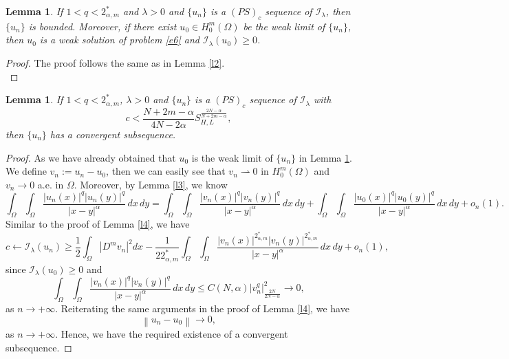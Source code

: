 \documentclass[reqno]{amsart}
\newtheorem{lemma}[theorem]{Lemma}
\newcommand{\DD} {\displaystyle}
\newcommand{\la} {\lambda}
\newcommand{\Om}{\Omega}
\newcommand{\weak}{\rightharpoonup}
\newcommand{\al} {\alpha}
\newcommand{\mc} {\mathcal}
\numberwithin{theorem}{section} \numberwithin{equation}{section}
\begin{document}
\begin{lemma}\label{l7}
If $1<q<2_{\al, m}^*$ and $\la>0$ and $\{u_n\}$ is a $(P S)_c$ sequence of $\mc{I_\la}$, then $\{u_n\}$ is bounded. Moreover, if there exist $u_0\in H_0^m(\Om)$ be the weak limit of $\{u_n\}$, then $u_0$ is a weak solution of problem \eqref{e6} and $\mc{I_\la}(u_0)\geq0$.
\end{lemma}
\begin{proof}
The proof follows the same as in Lemma \ref{l2}.\\

\end{proof}
\begin{lemma}\label{l8}
If $1<q<2_{\al, m}^*$, $\la>0$ and $\{u_n\}$ is a $(P S)_c$ sequence of $\mc{I}_\la$ with
\[c<\frac{N+2m-\al}{4 N-2 \al} S_{H, L}^{\frac{2N-\al}{N+2m-\al}},\]
then $\{u_n\}$ has a convergent subsequence.
\end{lemma}
\begin{proof}
As we have already obtained that $u_0$ is the weak limit of $\{u_n\}$ in Lemma \ref{l7}.\\ We define $v_n:=u_n-u_0$, then we can easily see that $v_n \weak 0$ in $H_0^m(\Om)$ and $v_n \rightarrow 0$ a.e. in $\Om$. Moreover, by Lemma \ref{l3}, we know
\[\DD\int_{\Om} \int_{\Om} \frac{|u_n(x)|^q |u_n(y)|^q}{|x-y|^\al} \, dx \, dy=\int_{\Om} \int_{\Om} \frac{\left|v_n(x)\right|^q\left|v_n(y)\right|^q}{|x-y|^\al} \, dx \, dy+\int_{\Om} \int_{\Om} \frac{|u_0(x)|^q\left|u_0(y)\right|^q}{|x-y|^\al} \, dx \, dy+o_n(1).\]
Similar to the proof of Lemma \ref{l4}, we have
\[
c \leftarrow \mc{I_\la}\left(u_n\right) \geq \frac{1}{2} \int_{\Om}\left|D^mv_n\right|^2 d x-\frac{1}{22_{\al, m}^*} \int_{\Om} \int_{\Om} \frac{\left|v_n(x)\right|^{2_{\al, m}^*}\left|v_n(y)\right|^{2_{\al, m}^*}}{|x-y|^\al} \, dx \, dy+o_n(1),
\]
since $\mc{I_\la}(u_0) \geq 0$ and
\[
\int_{\Om} \int_{\Om} \frac{\left|v_n(x)\right|^q\left|v_n(y)\right|^q}{|x-y|^\al} \, dx \, dy \leq C(N, \al)\left|v_n^q\right|_{\frac{2N}{2N-\al}}^2 \rightarrow 0,
\]
as $n \rightarrow+\infty$. Reiterating the same arguments in the proof of Lemma \ref{l4}, we have
\[\left\|u_n-u_0\right\| \rightarrow 0,\]
as $n \rightarrow+\infty$. Hence, we have the required existence of a convergent subsequence.
\end{proof}
\end{document}
